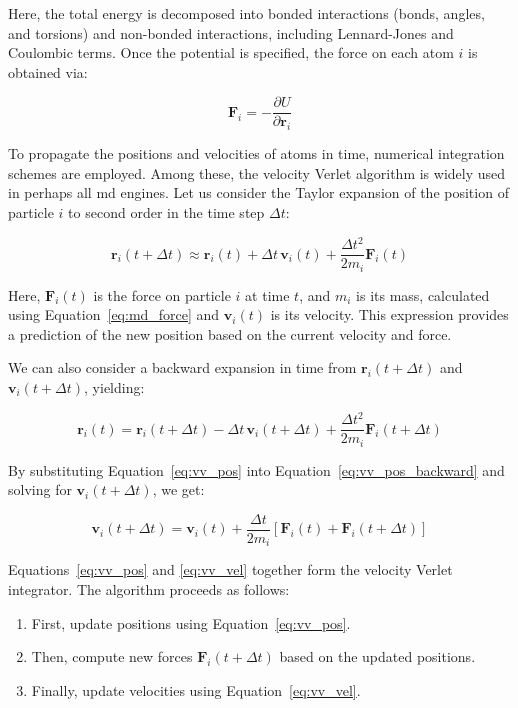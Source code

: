 Here, the total energy is decomposed into bonded interactions (bonds, angles, and torsions) and non-bonded interactions, including Lennard-Jones and Coulombic terms. Once the potential is specified, the force on each atom $i$ is obtained via:

\begin{equation}
    \mathbf{F}_i = -\frac{\partial U}{\partial \mathbf{r}_i}
    \label{eq:md_force}
\end{equation}

To propagate the positions and velocities of atoms in time, numerical integration schemes are employed. Among these, the velocity Verlet algorithm is widely used in perhaps all \ac{md} engines. Let us consider the Taylor expansion of the position of particle $i$ to second order in the time step $\Delta t$:

\begin{equation}
    \mathbf{r}_i(t + \Delta t) \approx \mathbf{r}_i(t) + \Delta t\, \mathbf{v}_i(t) + \frac{\Delta t^2}{2m_i} \mathbf{F}_i(t)
    \label{eq:vv_pos}
\end{equation}

Here, $\mathbf{F}_i(t)$ is the force on particle $i$ at time $t$, and $m_i$ is its mass, calculated using Equation~\ref{eq:md_force} and $\mathbf{v}_i(t)$ is its velocity. This expression provides a prediction of the new position based on the current velocity and force.

We can also consider a backward expansion in time from $\mathbf{r}_i(t + \Delta t)$ and $\mathbf{v}_i(t + \Delta t)$, yielding:

\begin{equation}
    \mathbf{r}_i(t) = \mathbf{r}_i(t + \Delta t) - \Delta t\, \mathbf{v}_i(t + \Delta t) + \frac{\Delta t^2}{2m_i} \mathbf{F}_i(t + \Delta t)
    \label{eq:vv_pos_backward}
\end{equation}

By substituting Equation~\ref{eq:vv_pos} into Equation~\ref{eq:vv_pos_backward} and solving for $\mathbf{v}_i(t + \Delta t)$, we get:

\begin{equation}
    \mathbf{v}_i(t + \Delta t) = \mathbf{v}_i(t) + \frac{\Delta t}{2m_i} \left[ \mathbf{F}_i(t) + \mathbf{F}_i(t + \Delta t) \right]
    \label{eq:vv_vel}
\end{equation}

Equations~\ref{eq:vv_pos} and \ref{eq:vv_vel} together form the velocity Verlet integrator. The algorithm proceeds as follows:
\begin{enumerate}
  \item First, update positions using Equation~\ref{eq:vv_pos}.
  \item Then, compute new forces $\mathbf{F}_i(t + \Delta t)$ based on the updated positions.
  \item Finally, update velocities using Equation~\ref{eq:vv_vel}.
\end{enumerate}

